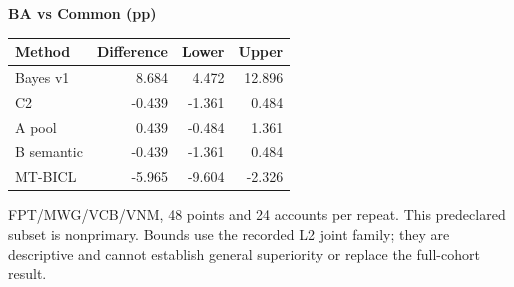 \begin{table}[!htb]
\begin{minipage}[t]{0.48\textwidth}
\begin{tabular}{lrrr}
\hline
\end{tabular}
\end{minipage}\hfill
\begin{minipage}[t]{0.48\textwidth}
\centering
\textbf{BA vs Common (pp)}\par\smallskip
\begin{tabular}{lrrr}
\hline
Method & Difference & Lower & Upper \\
\hline
Bayes v1 & 8.684 & 4.472 & 12.896 \\
C2 & -0.439 & -1.361 & 0.484 \\
A pool & 0.439 & -0.484 & 1.361 \\
B semantic & -0.439 & -1.361 & 0.484 \\
MT-BICL & -5.965 & -9.604 & -2.326 \\
\hline
\end{tabular}
\end{minipage}\par\medskip
\begin{minipage}{\textwidth}\footnotesize FPT/MWG/VCB/VNM, 48 points and 24 accounts per repeat. This predeclared subset is nonprimary. Bounds use the recorded L2 joint family; they are descriptive and cannot establish general superiority or replace the full-cohort result.\end{minipage}
\end{table}
